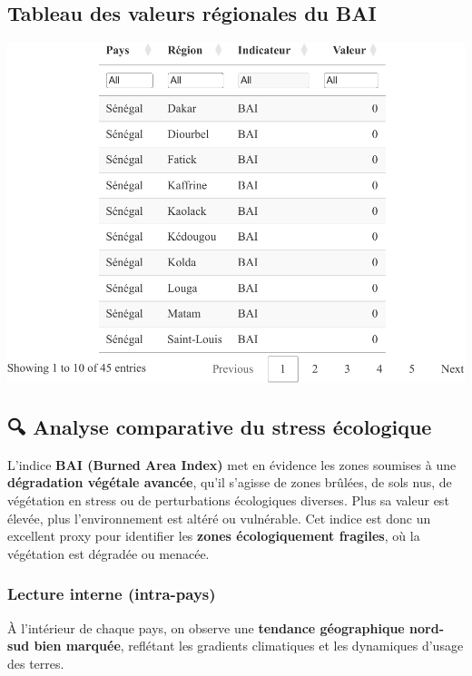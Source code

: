 \documentclass[
]{book}
\begin{document}
\subsection{Tableau des valeurs régionales du BAI}\label{tableau-des-valeurs-ruxe9gionales-du-bai}

\includegraphics{Atlas-Spectral-Sahel_files/figure-latex/bai-table-1.pdf}

\subsection{🔍 Analyse comparative du stress écologique}\label{analyse-comparative-du-stress-uxe9cologique}

L'indice \textbf{BAI (Burned Area Index)} met en évidence les zones soumises à une \textbf{dégradation végétale avancée}, qu'il s'agisse de zones brûlées, de sols nus, de végétation en stress ou de perturbations écologiques diverses. Plus sa valeur est élevée, plus l'environnement est altéré ou vulnérable. Cet indice est donc un excellent proxy pour identifier les \textbf{zones écologiquement fragiles}, où la végétation est dégradée ou menacée.

\subsubsection{Lecture interne (intra-pays)}\label{lecture-interne-intra-pays-1}

À l'intérieur de chaque pays, on observe une \textbf{tendance géographique nord-sud bien marquée}, reflétant les gradients climatiques et les dynamiques d'usage des terres.
\end{document}
